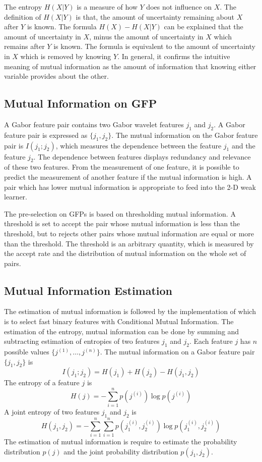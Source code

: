 The entropy $H(X|Y)$ is a measure of how $Y$ does not influence on $X$. The definition of $H(X|Y)$ is that, the amount of uncertainty remaining about $X$ after $Y$ is known. The formula $H(X) - H(X|Y)$  can be explained that the amount of uncertainty in $X$, minus the amount of uncertainty in $X$ which remains after $Y$ is known. The formula is equivalent to the amount of uncertainty in $X$ which is removed by knowing $Y$. In general, it confirms the intuitive meaning of mutual information as the amount of information that knowing either variable provides about the other.

\subsection{Mutual Information on GFP}
A Gabor feature pair contains two Gabor wavelet features $j_1$ and $j_2$. A Gabor feature pair is expressed as $\{j_{1},j_{2}\}$. The mutual information on the Gabor feature pair is $I(j_1;j_2)$, which measures the dependence between the feature $j_1$ and the feature $j_2$. The dependence between features displays redundancy and relevance of these two features. From the measurement of one feature, it is possible to predict the measurement of another feature if the mutual information is high. A pair which has lower mutual information is appropriate to feed into the 2-D weak learner.

The pre-selection on GFPs is based on thresholding mutual information. A threshold is set to accept the pair whose mutual information is less than the threshold, but to rejects other pairs whose mutual information are equal or more than the threshold. The threshold is an arbitrary quantity, which is measured by the accept rate and the distribution of mutual information on the whole set of pairs.

\subsection{Mutual Information Estimation}
The estimation of mutual information is followed by the implementation of \cite{Fleuret2004} which is to select fast binary features with Conditional Mutual Information. The estimation of the entropy, mutual information can be done by summing and subtracting estimation of entropies of two features $j_1$ and $j_2$. Each feature $j$ has $n$ possible values $\{j^{(1)},\ldots,j^{(n)}\}$. The mutual information on a Gabor feature pair $\{j_{1},j_{2}\}$ is
\begin{equation}
 I(j_1;j_2) = H(j_1) + H(j_2) - H(j_1,j_2)
\end{equation}
The entropy of a feature $j$ is
\begin{equation}
 H(j) = - {\sum_{i=1}^np(j^{(i)})\log p(j^{(i)})}
\end{equation}
A joint entropy of two features $j_1$ and $j_2$ is
\begin{equation}
 H(j_1,j_2) = -{\sum_{i=1}^n \sum_{i=1}^n  p(j_1^{(i)}, j_2^{(i)})    \log p(j_1^{(i)},j_2^{(i)}) }
\end{equation}
The estimation of mutual information is require to estimate the probability distribution $p(j)$ and the joint probability distribution $p(j_1,j_2)$. 

